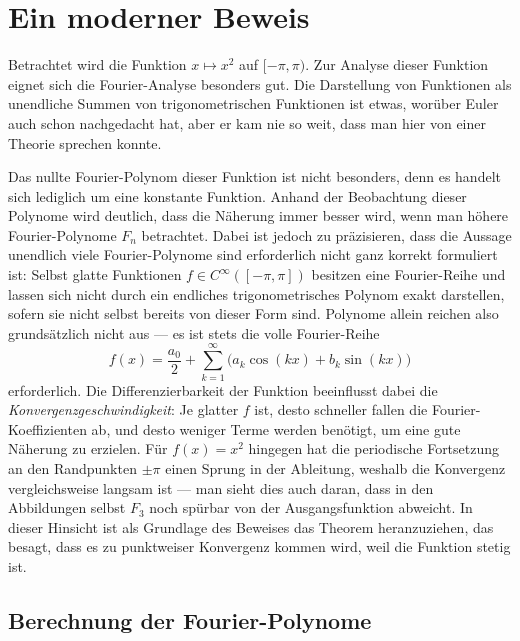 %
%
%
%
\section{Ein moderner Beweis
\label{basel:section:moderner-beweis}}

Betrachtet wird die Funktion $x \mapsto x^2$ auf $[-\pi, \pi)$.
Zur Analyse dieser Funktion eignet sich die Fourier-Analyse besonders gut.
Die Darstellung von Funktionen als unendliche Summen von trigonometrischen
Funktionen ist etwas, worüber Euler auch schon nachgedacht hat, aber er kam nie
so weit, dass man hier von einer Theorie sprechen konnte.



Das nullte Fourier-Polynom dieser Funktion ist nicht besonders, denn es handelt sich
lediglich um eine konstante Funktion.
Anhand der Beobachtung dieser Polynome wird deutlich, dass die Näherung immer
besser wird, wenn man höhere Fourier-Polynome $F_n$ betrachtet.
Dabei ist jedoch zu präzisieren, dass die Aussage \glqq unendlich viele Fourier-Polynome
sind erforderlich\grqq{} nicht ganz korrekt formuliert ist:
Selbst glatte Funktionen $f \in C^\infty([-\pi,\pi])$ besitzen eine Fourier-Reihe
und lassen sich nicht durch ein endliches trigonometrisches Polynom exakt darstellen,
sofern sie nicht selbst bereits von dieser Form sind.
Polynome allein reichen also grundsätzlich nicht aus --- es ist stets die volle
Fourier-Reihe
\[
f(x) = \frac{a_0}{2} + \sum_{k=1}^{\infty} \bigl(a_k \cos(kx) + b_k \sin(kx)\bigr)
\]
erforderlich.
Die Differenzierbarkeit der Funktion beeinflusst dabei die \emph{Konvergenzgeschwindigkeit}:
Je glatter $f$ ist, desto schneller fallen die Fourier-Koeffizienten ab, und
desto weniger Terme werden benötigt, um eine gute Näherung zu erzielen.
Für $f(x) = x^2$ hingegen hat die periodische Fortsetzung an den Randpunkten
$\pm\pi$ einen Sprung in der Ableitung, weshalb die Konvergenz vergleichsweise
langsam ist --- man sieht dies auch daran, dass in den Abbildungen selbst $F_3$
noch spürbar von der Ausgangsfunktion abweicht.
In dieser Hinsicht ist als Grundlage des Beweises das Theorem heranzuziehen,
das besagt, dass es zu punktweiser Konvergenz kommen wird, weil die Funktion
stetig ist.

\subsection{Berechnung der Fourier-Polynome}
\label{basel:subsection:berechnung-fourierpolynome}

